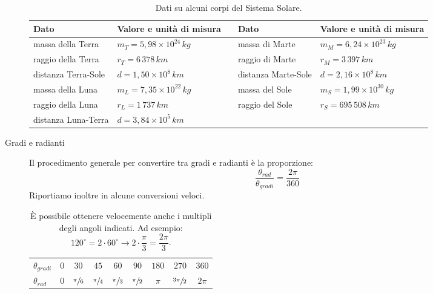 \documentclass[a4paper,11pt,italian]{article}
\begin{document}
\begin{description}
  \begin{table}[htp]\centering
    \begin{tabular}{lllll}\toprule
      \textbf{Dato} & \textbf{Valore e unità di misura} &&
      \textbf{Dato} & \textbf{Valore e unità di misura}\\\midrule
      massa della Terra   & $ m_T = 5,98 \times 10^{24} \, kg	$ &&
      massa di Marte      & $ m_M = 6,24 \times 10^{23} \, kg $\\\addlinespace[.2em]
      raggio della Terra  & $ r_T = 6 \, 378 \, km $ &&
      raggio di Marte     & $ r_M = 3 \, 397 \, km $ \\\addlinespace[.2em]
      distanza Terra-Sole & $ d = 1,50 \times 10^8 \, km $ && 
      distanza Marte-Sole & $ d = 2,16 \times 10^8 \, km $\\\addlinespace[.2em]
      massa della Luna    & $ m_L = 7,35 \times 10^{22} \, kg $ && 
      massa del Sole      & $ m_S = 1,99 \times 10^{30} \, kg $\\\addlinespace[.2em]
      raggio della Luna   & $ r_L = 1 \, 737 \, km $ &&
      raggio del Sole     & $ r_S = 695 \, 508 \, km $ \\\addlinespace[.2em]
      distanza Luna-Terra & $ d = 3,84 \times 10^5 \, km $ &&&\\\bottomrule
    \end{tabular}
  \caption{Dati su alcuni corpi del Sistema Solare.}
    \label{tab:datisistemasolare}
  \end{table} 

  \item[Gradi e radianti] Il procedimento generale per convertire tra gradi e radianti è la proporzione:
  \[ \frac{\theta_{rad}}{\theta_{gradi}} = \frac{2\pi}{360} \]
  Riportiamo inoltre in  alcune conversioni veloci.
  \begin{table}[htp]\centering
    \begin{tabular}{lcccccccc}\toprule
        \boldmath$ \theta_{gradi} $ & $ 0 $ & $ 30 $ & $ 45 $ & $ 60 $ & $ 90 $ & $ 180 $ & $ 270 $ & $ 360 $\\\addlinespace[.2em]\midrule
        \boldmath$ \theta_{rad} $ & $ 0 $ & $ \sfrac{\pi}{6} $ & $ \sfrac{\pi}{4} $ & $ \sfrac{\pi}{3} $ & $ \sfrac{\pi}{2} $ & $ \pi $ & $ \sfrac{3\pi}{2} $ & $ 2\pi $\\\bottomrule
    \end{tabular}
    \caption{È possibile ottenere velocemente anche i multipli degli angoli indicati. Ad esempio: $ 120^{\circ} = 2\cdot 60^{\circ} \rightarrow 2 \cdot \dfrac{\pi}{3} = \dfrac{2\pi}{3} $.}\label{tab:gradiradianti}
  \end{table}
\end{description}
\end{document}
